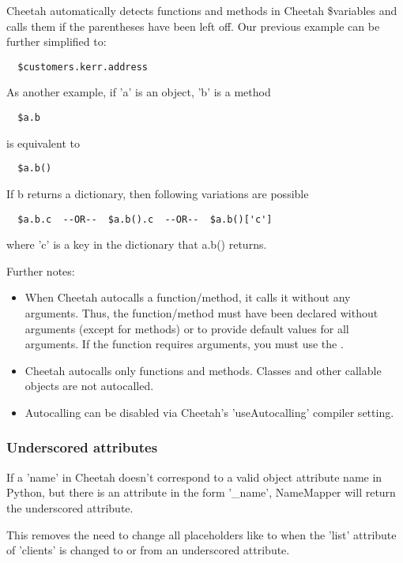 Cheetah automatically detects functions and methods in Cheetah \$variables and
calls them if the parentheses have been left off.  Our previous example can be
further simplified to:
\begin{verbatim}
  $customers.kerr.address
\end{verbatim}

As another example, if 'a' is an object, 'b' is a method
\begin{verbatim}
  $a.b
\end{verbatim}

is equivalent to

\begin{verbatim}
  $a.b()
\end{verbatim}

If b returns a dictionary, then following variations are possible
\begin{verbatim}
  $a.b.c  --OR--  $a.b().c  --OR--  $a.b()['c']
\end{verbatim}
where 'c' is a key in the dictionary that a.b() returns.

Further notes:
\begin{itemize}
\item When Cheetah autocalls a function/method, it calls it without any
arguments.  Thus, the function/method must have been declared without arguments
(except  for methods) or to provide default values for all arguments.
If the function requires arguments, you must use the \code{()}.

\item Cheetah autocalls only functions and methods.  Classes and other callable
objects are not autocalled.  

\item Autocalling can be disabled via Cheetah's 'useAutocalling' compiler
setting.
\end{itemize}

\subsubsection{Underscored attributes}
\label{language.namemapper.underscore}

If a 'name' in Cheetah doesn't correspond to a valid object attribute name in
Python, but there is an attribute in the form '\_name', NameMapper will return
the underscored attribute.

This removes the need to change all placeholders like  to
 when the 'list' attribute of 'clients' is changed to or
from an underscored attribute.


